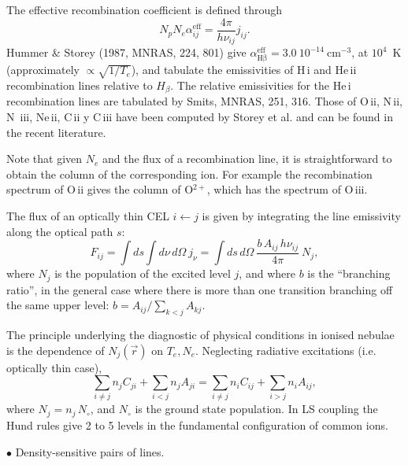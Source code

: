 

The effective recombination coefficient is defined through 
\[
N_p N_e \alpha_{ij}^\mathrm{eff} = \frac{4 \pi}{h \nu_{ij}}  j_{ij}.
\]
Hummer \& Storey (1987, MNRAS, 224, 801) give 
$\alpha_\mathrm{H\beta}^\mathrm{eff} =3.0~10^{-14}~$cm$^{-3}$, at
$10^4$~K (approximately  $\propto
\sqrt{1/T_e}$), and tabulate the emissivities of H\,{\sc i} and
He\,{\sc ii} recombination lines relative to $H_\beta$. The relative
emissivities for the He\,{\sc i} recombination lines are tabulated by
Smits, MNRAS, 251, 316. Those of O\,{\sc ii}, N\,{\sc ii}, N\,{\sc
iii}, Ne\,{\sc ii}, C\,{\sc ii} y C\,{\sc iii} have been computed by
Storey et al. and can be found in the recent literature.

Note that given $N_e$ and the flux of a recombination line, it is
straightforward to obtain the column of the corresponding ion. For
example the recombination spectrum of O\,{\sc ii} gives the column of
O$^{2+}$, which has the spectrum of O\,{\sc iii}.





The flux of an optically thin CEL $i \leftarrow j$ is given by
integrating the line emissivity along the optical path $s$:
\[
F_{ij} = \int ds \int d\nu \, d\Omega ~ j_\nu = \int ds \, d\Omega ~ \frac{b\,
A_{ij}\, h\nu_{ij}}{4\pi}~ N_j ,
\]
where  $N_j$ is the population of the excited level $j$, and where $b$
is the ``branching ratio'', in the general case where there is more
than one transition branching off the same upper level: $b = A_{ij} /
\sum_{k<j} A_{kj}$.

The principle underlying the diagnostic of physical conditions in
ionised nebulae is the dependence of $N_j(\vec{r})$ on
$T_e,N_e$. Neglecting radiative excitations (i.e. optically thin case),
\[
\sum_{i{\neq}j}
{n}_{j}{C}_{ji} +
\sum_{i<j}{n}_{j}{A}_{ji} = \sum_{i{\neq}j}{n}_{i}{C}_{ij}  + \sum_{i>j}{n}_{i}{A}_{ij}, 
\]
where $N_j = n_j \, N_\circ$, and $N_\circ$ is the ground state
population. In LS coupling the Hund rules give 2 to 5 levels in the
fundamental configuration of common ions. 


{$\bullet$} Density-sensitive pairs of  lines.  \\

